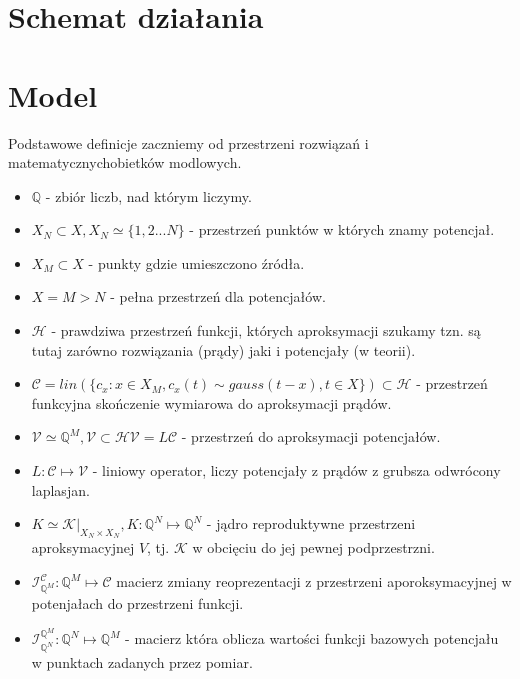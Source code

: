 \documentclass[9pt]{article}
\newcommand{\Q}{\mathbb{Q}}
\newcommand{\HS}{\mathcal{H}}
\newcommand{\V}{\mathcal{V}}
\newcommand{\C}{\mathcal{C}}
\newcommand{\IC}{ \mathcal{I}_{\Q^M}^{\C}}
\newcommand{\IV}{ \mathcal{I}_{\Q^N}^{\Q^M}}
\begin{document}
\section{Schemat działania}

\section{Model}
Podstawowe definicje zaczniemy od przestrzeni rozwiązań i matematycznychobietków modlowych.
\begin{itemize}
\item $\Q$ - zbiór liczb, nad którym liczymy.
\item $X_N \subset X, X_N \simeq \{1,2 ...N\}$ - przestrzeń punktów 
w których znamy potencjał.
\item $X_M \subset X$ - punkty gdzie umieszczono źródła.
\item $X =M>N$ - pełna przestrzeń dla potencjałów.
\item $\HS$ - prawdziwa przestrzeń funkcji, których aproksymacji szukamy
    tzn. są tutaj zarówno rozwiązania (prądy) jaki i potencjały (w teorii).
\item $\C = lin(\{ c_x: x \in X_M, c_x(t) \sim gauss(t-x), t\in X \}) \subset \HS$ 
- przestrzeń funkcyjna skończenie wymiarowa do aproksymacji prądów.
\item $\V \simeq {\Q^M}, \V \subset \HS \V=L\C$ - przestrzeń do aproksymacji potencjałów.
\item $L: \C \mapsto \V$ - liniowy operator, liczy potencjały z prądów
z grubsza odwrócony laplasjan.
\item $K \simeq \mathcal{K}|_{X_N \times  X_N}, K: \Q^N \mapsto \Q^N$ - jądro 
reproduktywne przestrzeni aproksymacyjnej $V$, tj. $\mathcal{K}$
w obcięciu do jej pewnej podprzestrzni.
\item $\IC: \Q^M \mapsto \C$ macierz zmiany reoprezentacji z przestrzeni
aporoksymacyjnej w potenjałach do przestrzeni funkcji.
\item $\IV: \Q^N \mapsto \Q^M$ - macierz która oblicza wartości funkcji bazowych 
potencjału w punktach zadanych przez pomiar.
\end{itemize}
\end{document}
